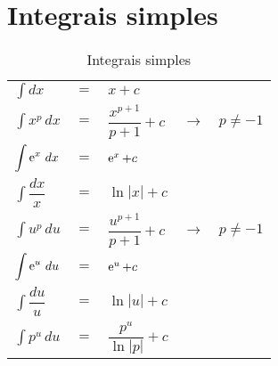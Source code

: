 \section{Integrais simples}
	\begin{table}[htb]
		\caption{Integrais simples}
		\label{integrais_simples}
		\centering
		\begin{tabular}{|lclcr|}
			$\displaystyle\int dx$            & $=$ & $x + c$                       &               &  \\
			$\displaystyle\int x^p\, dx$      & $=$ & $\dfrac{x^{p + 1}}{p+ 1} + c$ & $\rightarrow$ & $p\neq -1$ \\
			$\displaystyle\int \operatorname{e}^x\, dx$     & $=$ & $\operatorname{e}^x + c$                    &               &  \\
			$\displaystyle\int \dfrac{dx}{x}$ & $=$ & $\ln|x| + c$                  &               &  \\
			$\displaystyle\int u^p\, du$      & $=$ & $\dfrac{u^{p + 1}}{p+ 1} + c$ & $\rightarrow$ & $p\neq -1$ \\
			$\displaystyle\int \operatorname{e}^u\, du$     & $=$ & $\operatorname{e}^u + c$                    &               &  \\
			$\displaystyle\int \dfrac{du}{u}$ & $=$ & $\ln|u| + c$                  &               &  \\
			$\displaystyle\int p^u\, du$      & $=$ & $\dfrac{p^u}{\ln|p|} + c$     &               &
		\end{tabular}		
	\end{table}


